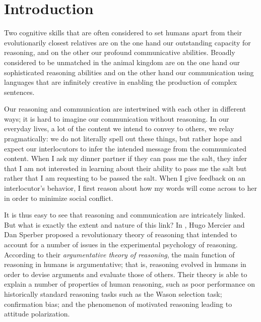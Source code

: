 \chapter*{Introduction}
\label{sec:introduction}


Two cognitive skills that are often considered to set humans apart from their evolutionarily closest relatives are on the one hand our outstanding capacity for reasoning, and on the other our profound communicative abilities.
Broadly considered to be unmatched in the animal kingdom \citep{CheneySeyfarth98} are on the one hand
our sophisticated reasoning abilities
and
on the other hand
our communication using languages that are infinitely creative in enabling the production of complex sentences.

Our reasoning and communication are intertwined with each other in different ways; it is hard to imagine our communication without reasoning. In our everyday lives, a lot of the content we intend to convey to others, we relay pragmatically: we do not literally spell out these things, but rather hope and expect our interlocutors to infer the intended message from the communicated content.
When I ask my dinner partner if they can pass me the salt, they infer that I am not interested in learning about their ability to pass me the salt but rather that I am requesting to be passed the salt.
When I give feedback on an interlocutor's behavior, I first reason about how my words will come across to her in order to minimize social conflict.

It is thus easy to see that reasoning and communication are intricately linked. But what is exactly the extent and nature of this link?
In \citeyear{MS11}, Hugo Mercier and Dan Sperber proposed a revolutionary theory of reasoning that intended to account for a number of issues in the experimental psychology of reasoning.
According to their \emph{argumentative theory of reasoning}, the main function of reasoning in humans is argumentative; that is, reasoning evolved in humans in order to devise arguments and evaluate those of others. Their theory is able to explain a number of properties of human reasoning, such as poor performance on historically standard reasoning tasks such as the Wason selection task;
confirmation bias; and the phenomenon of motivated reasoning leading to attitude polarization.


